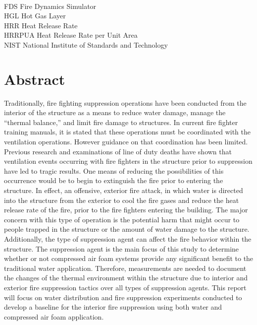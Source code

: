 \documentclass[12pt,oneside]{book}
\begin{document}
\begin{tabbing}
\hspace{1.5in} \= \\
FDS \> Fire Dynamics Simulator \\
HGL \> Hot Gas Layer \\
HRR \> Heat Release Rate \\
HRRPUA \> Heat Release Rate per Unit Area \\
NIST \> National Institute of Standards and Technology \\
\end{tabbing}
	
\mainmatter
	
\chapter{Abstract}
\label{chap:Abstract} 

Traditionally, fire fighting suppression operations have been conducted from the interior of the structure as a means to reduce water damage, manage the “thermal balance,” and limit fire damage to structures.  In current fire fighter training manuals, it is stated that these operations must be coordinated with the ventilation operations.  However guidance on that coordination has been limited.  Previous research and examinations of line of duty deaths have shown that ventilation events occurring with fire fighters in the structure prior to suppression have led to tragic results.  One means of reducing the possibilities of this occurrence would be to begin to extinguish the fire prior to entering the structure.  In effect, an offensive, exterior fire attack, in which water is directed into the structure from the exterior to cool the fire gases and reduce the heat release rate of the fire, prior to the fire fighters entering the building.  The major concern with this type of operation is the potential harm that might occur to people trapped in the structure or the amount of water damage to the structure.  Additionally, the type of suppression agent can affect the fire behavior within the structure.  The suppression agent is the main focus of this study to determine whether or not compressed air foam systems provide any significant benefit to the traditional water application.  Therefore, measurements are needed to document the changes of the thermal environment within the structure due to interior and exterior fire suppression tactics over all types of suppression agents.  This report will focus on water distribution and fire suppression experiments conducted to develop a baseline for the interior fire suppression using both water and compressed air foam application.
\end{document}

